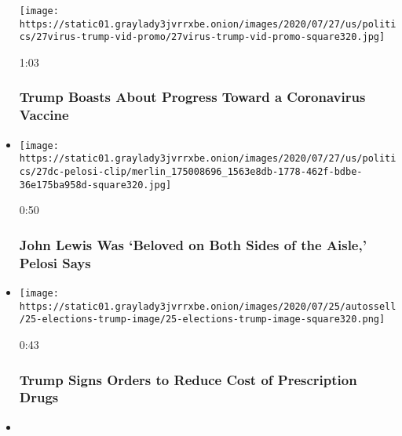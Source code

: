 \begin{itemize}
  \texttt{[image: https://static01.graylady3jvrrxbe.onion/images/2020/07/27/us/politics/27virus-trump-vid-promo/27virus-trump-vid-promo-square320.jpg]}

  1:03

  \hypertarget{trump-boasts-about-progress-toward-a-coronavirus-vaccine}{%
  \subsubsection{Trump Boasts About Progress Toward a Coronavirus
  Vaccine}\label{trump-boasts-about-progress-toward-a-coronavirus-vaccine}}
\item
  \href{https://www.nytimes3xbfgragh.onion/video/us/100000007259050/john-lewis-memorial-pelosi.html?action=click\&module=video-series-bar\&region=header\&pgtype=Article\&playlistId=video/us-politics}{}

  \texttt{[image: https://static01.graylady3jvrrxbe.onion/images/2020/07/27/us/politics/27dc-pelosi-clip/merlin\_175008696\_1563e8db-1778-462f-bdbe-36e175ba958d-square320.jpg]}

  0:50

  \hypertarget{john-lewis-was-beloved-on-both-sides-of-the-aisle-pelosi-says}{%
  \subsubsection{John Lewis Was `Beloved on Both Sides of the Aisle,'
  Pelosi
  Says}\label{john-lewis-was-beloved-on-both-sides-of-the-aisle-pelosi-says}}
\item
  \href{https://www.nytimes3xbfgragh.onion/video/us/100000007255909/trump-executive-order-prescription-drugs.html?action=click\&module=video-series-bar\&region=header\&pgtype=Article\&playlistId=video/us-politics}{}

  \texttt{[image: https://static01.graylady3jvrrxbe.onion/images/2020/07/25/autossell/25-elections-trump-image/25-elections-trump-image-square320.png]}

  0:43

  \hypertarget{trump-signs-orders-to-reduce-cost-of-prescription-drugs}{%
  \subsubsection{Trump Signs Orders to Reduce Cost of Prescription
  Drugs}\label{trump-signs-orders-to-reduce-cost-of-prescription-drugs}}
\item
  \href{https://www.nytimes3xbfgragh.onion/video/us/100000007256158/pelosi-rejects-unemployment-extension.html?action=click\&module=video-series-bar\&region=header\&pgtype=Article\&playlistId=video/us-politics}{}


\end{itemize}
